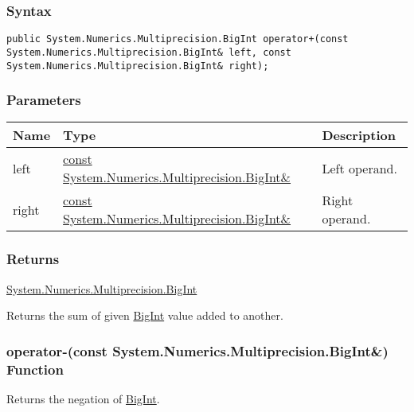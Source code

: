 \documentclass[a4paper,oneside,11.000000pt]{book}
\begin{document}
\subsubsection*{Syntax}
\texttt{public System.Numerics.Multiprecision.BigInt operator+(const System.Numerics.Multiprecision.BigInt\& left, const System.Numerics.Multiprecision.BigInt\& right);}
\subsubsection*{Parameters}
\begin{flushleft}
\begin{supertabular}[l]{!{\raggedright}p{1.30721cm}!{\raggedright}p{8.55945cm}!{\raggedright}p{3.66839cm}}
\textbf{Name}
& \textbf{Type}
& \textbf{Description}
\\
\hline
left
& \hyperlink{System.Numerics.Multiprecision.BigInt}{const System.\-Numerics.\-Multiprecision.\-BigInt\&\-}
& Left operand.

\\
right
& \hyperlink{System.Numerics.Multiprecision.BigInt}{const System.\-Numerics.\-Multiprecision.\-BigInt\&\-}
& Right operand.

\\
\end{supertabular}

\end{flushleft}
\subsubsection*{Returns}
\hyperlink{System.Numerics.Multiprecision.BigInt}{System.\-Numerics.\-Multiprecision.\-BigInt}
\begin{flushleft}
Returns the sum of given \hyperlink{System.Numerics.Multiprecision.BigInt}{BigInt} value added to another.

\end{flushleft}
\clearpage

\hypertarget{System.Numerics.Multiprecision.operator.minus.C.R.System.Numerics.Multiprecision.BigInt}{\subsubsection*{operator-(const System.Numerics.Multiprecision.BigInt\&) Function}}
\begin{flushleft}
Returns the negation of \hyperlink{System.Numerics.Multiprecision.BigInt}{BigInt}.

\end{flushleft}
\end{document}
